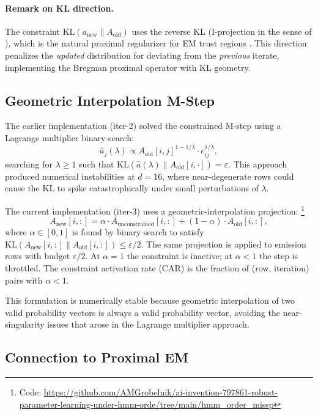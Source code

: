 \documentclass[11pt,letterpaper]{article}
\begin{document}
\paragraph{Remark on KL direction.}
The constraint $\mathrm{KL}(a_\text{new} \| A_\text{old})$ uses the reverse KL (I-projection in the sense of
\citet{Csiszar1975}), which is the natural proximal regularizer for EM trust regions \citep{Kunstner2021,Cappe2009}.
This direction penalizes the \emph{updated} distribution for deviating from the \emph{previous} iterate, implementing the
Bregman proximal operator with KL geometry.

\subsection{Geometric Interpolation M-Step}

The earlier implementation (iter-2) solved the constrained M-step using a Lagrange multiplier binary-search:
\[
  \hat{a}_j(\lambda) \propto A_\text{old}[i,j]^{1 - 1/\lambda} \cdot c_{ij}^{1/\lambda},
\]
searching for $\lambda \geq 1$ such that $\mathrm{KL}(\hat{a}(\lambda) \| A_\text{old}[i,\cdot]) = \varepsilon$. This
approach produced numerical instabilities at $d=16$, where near-degenerate rows could cause the KL to spike catastrophically
under small perturbations of $\lambda$.

The current implementation (iter-3) uses a geometric-interpolation projection:
\footnote{Code: \url{https://github.com/AMGrobelnik/ai-invention-797861-robust-parameter-learning-under-hmm-orde/tree/main/hmm_order_missp}}
\[
  A_\text{new}[i,:] = \alpha \cdot A_\text{unconstrained}[i,:] + (1-\alpha) \cdot A_\text{old}[i,:],
\]
where $\alpha \in [0,1]$ is found by binary search to satisfy $\mathrm{KL}(A_\text{new}[i,:] \| A_\text{old}[i,:]) \leq
\varepsilon/2$. The same projection is applied to emission rows with budget $\varepsilon/2$. At $\alpha=1$ the constraint
is inactive; at $\alpha<1$ the step is throttled. The constraint activation rate (CAR) is the fraction of (row, iteration)
pairs with $\alpha < 1$.

This formulation is numerically stable because geometric interpolation of two valid probability vectors is always a valid
probability vector, avoiding the near-singularity issues that arose in the Lagrange multiplier approach.

\subsection{Connection to Proximal EM}
\end{document}
